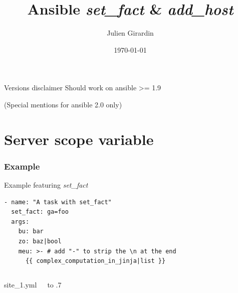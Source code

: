 \documentclass{beamer}
\title{Ansible \textit{set\_fact} \& \textit{add\_host}}
\author{Julien Girardin}
\date{\today}
\begin{document}
\maketitle{}

\begin{frame}
    \begin{exampleblock}{Versions disclaimer}
        Should work on ansible >= 1.9

        (Special mentions for ansible 2.0 only)
    \end{exampleblock}
\end{frame}

\section{Server scope variable}

\begin{frame}[fragile]
\frametitle{Example}
    \begin{exampleblock}{Example featuring \textit{set\_fact}}
        \begin{verbatim}
- name: "A task with set_fact"
  set_fact: ga=foo
  args:
    bu: bar
    zo: baz|bool
    meu: >- # add "-" to strip the \n at the end
      {{ complex_computation_in_jinja|list }}
        \end{verbatim}
    \end{exampleblock}
\end{frame}


\begin{frame}[fragile]
    \begin{columns}
        \begin{block}{site\_1.yml}
        \footnotesize{
            \inputminted[firstline=1, lastline=2]
                        {yaml}{sources/site_1.yml}
            \inputminted[firstline=3, lastline=3,
                        frame=single,
                        framesep=0pt]
                        {yaml}{sources/site_1.yml}
            \inputminted[firstline=4, lastline=10]
                        {yaml}{sources/site_1.yml}
            \inputminted[firstline=11, lastline=11,
                        frame=single,
                        framesep=0pt]
                        {yaml}{sources/site_1.yml}
        }
        \end{block}

        \vbox to .7
    \end{columns}
\end{frame}
\end{document}
